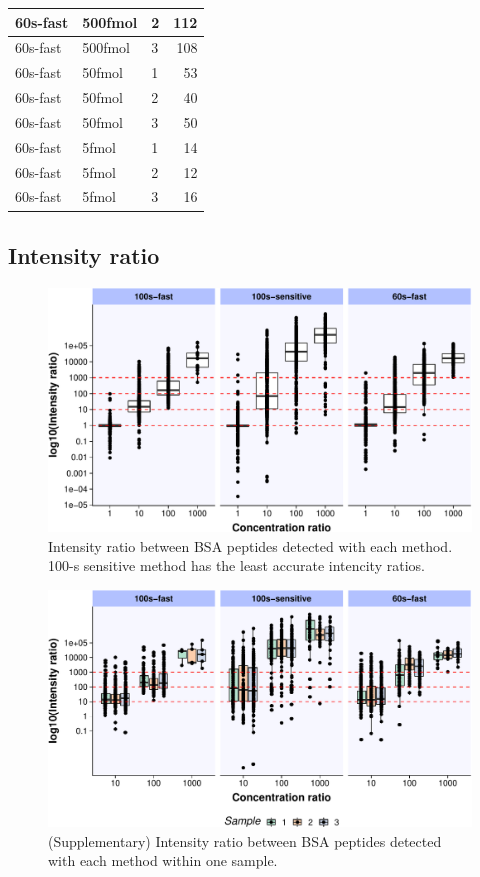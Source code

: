 \documentclass[]{article}
\begin{document}
\begin{table}
\begin{tabular}[t]{l|l|l|r}
\hline
60s-fast & 500fmol & 2 & 112\\
\hline
60s-fast & 500fmol & 3 & 108\\
\hline
60s-fast & 50fmol & 1 & 53\\
\hline
60s-fast & 50fmol & 2 & 40\\
\hline
60s-fast & 50fmol & 3 & 50\\
\hline
60s-fast & 5fmol & 1 & 14\\
\hline
60s-fast & 5fmol & 2 & 12\\
\hline
60s-fast & 5fmol & 3 & 16\\
\hline
\end{tabular}
\end{table}

\newpage

\hypertarget{intensity-ratio}{%
\subsection{Intensity ratio}\label{intensity-ratio}}

\begin{figure}
\centering
\includegraphics{BSA_files/figure-latex/unnamed-chunk-3-1.pdf}
\caption{\label{fig:unnamed-chunk-3}Intensity ratio between BSA peptides detected with each method. 100-s sensitive method has the least accurate intencity ratios.}
\end{figure}

\begin{figure}
\centering
\includegraphics{BSA_files/figure-latex/unnamed-chunk-4-1.pdf}
\caption{\label{fig:unnamed-chunk-4}(Supplementary) Intensity ratio between BSA peptides detected with each method within one sample.}
\end{figure}
\end{document}
